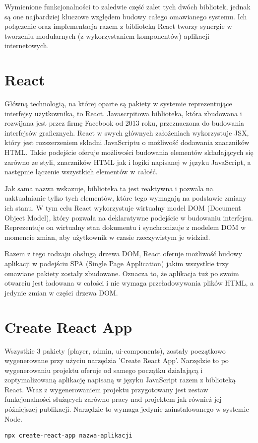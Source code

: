 Wymienione funkcjonalności to zaledwie część zalet tych dwóch bibliotek, jednak są one najbardziej kluczowe względem budowy całego omawianego systemu. Ich połączenie oraz implementacja razem z biblioteką React tworzy synergie w tworzeniu modularnych (z wykorzystaniem komponentów) aplikacji internetowych. 

\label{ch:frontend:react}
\section{React}
Główną technologią, na której oparte są pakiety w systemie reprezentujące interfejsy użytkownika, to React. Javascrpitowa biblioteka, która zbudowana i rozwijana jest przez firmę Facebook od 2013 roku, przeznaczona do budowania interfejsów graficznych. React w swych głównych założeniach wykorzystuje JSX, który jest rozszerzeniem składni JavaScriptu o możliwość dodawania znaczników HTML. Takie podejście oferuje możliwości budowania elementów składających się zarówno ze styli, znaczników HTML jak i logiki napisanej w języku JavaScript, a następnie łączenie wszystkich elementów w całość.

Jak sama nazwa wskazuje, biblioteka ta jest reaktywna i pozwala na uaktualnianie tylko tych elementów, które tego wymagają na podstawie zmiany ich stanu. W tym celu React wykorzystuje wirtualny model DOM (Document Object Model), który pozwala na deklaratywne podejście w budowaniu interfejsu. Reprezentuje on wirtualny stan dokumentu i synchronizuje z modelem DOM w momencie zmian, aby użytkownik w czasie rzeczywistym je widział.

Razem z tego rodzaju obsługą drzewa DOM, React oferuje możliwość budowy aplikacji w podejściu SPA (Single Page Application) jakim wszystkie trzy omawiane pakiety zostały zbudowane. Oznacza to, że aplikacja tuż po swoim otwarciu jest ładowana w całości i nie wymaga przeładowywania plików HTML, a jedynie zmian w części drzewa DOM.

\section{Create React App}
Wszystkie 3 pakiety (player, admin, ui-components), zostały początkowo wygenerowane przy użyciu narzędzia 'Create React App'. Narzędzie to po wygenerowaniu projektu oferuje od samego początku działającą i zoptymalizowaną aplikację napisaną w języku JavaScript razem z biblioteką React. Wraz z wygenerowaniem projektu przygotowany jest zestaw funkcjonalności służących zarówno pracy nad projektem jak również jej późniejszej publikacji.
Narzędzie to wymaga jedynie zainstalowanego w systemie Node.
\begin{lstlisting}[caption={Tworzenie aplikacji z wykorzystaniem Create React App}]
    npx create-react-app nazwa-aplikacji
\end{lstlisting}

